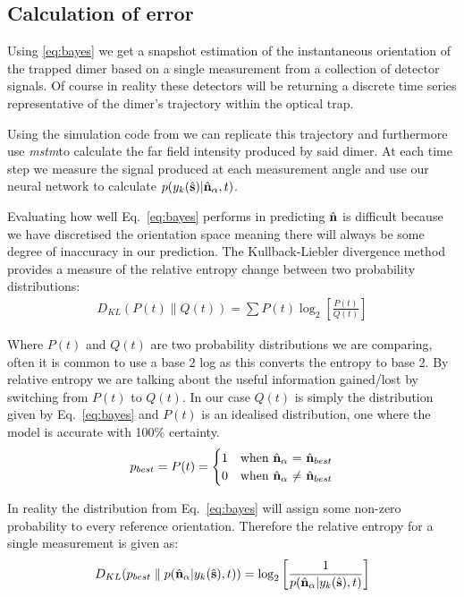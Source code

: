 \subsection{Calculation of error}
\label{sec:divergence}
Using \eqref{eq:bayes} we get a snapshot estimation of the instantaneous
orientation of the trapped dimer based on a single measurement from a 
collection of detector signals. Of course in reality these detectors 
will be returning a discrete time series representative of the dimer's
trajectory within the optical trap. 

Using the simulation code from \cite{Vigilante2020} we can replicate 
this trajectory and furthermore use \textit{mstm}to calculate the far field 
intensity produced by said dimer. At each time step we measure the signal
produced at each measurement angle and use our neural network to calculate
$p(y_k(\hat{\bf s})|\hat{\bf n}_\alpha, t)$. 

Evaluating how well Eq.~\eqref{eq:bayes} performs in predicting $\hat{\bf n}$
is difficult because we have discretised the orientation space meaning 
there will always be some degree of inaccuracy in our prediction. The Kullback-Liebler divergence method provides a measure of the relative
entropy change between two probability distributions:
\begin{align}
	D_{KL}(P(t)\parallel Q(t)) = \sum P(t) \log_2\left[\frac{P(t)}{Q(t)}\right] 
	\label{eq:D_KL}
\end{align} 

Where $P(t)$ and $Q(t)$ are two probability distributions we are
comparing, often it is common to use a base 2 log as this converts 
the entropy to base 2. By relative entropy we are talking about 
the useful information gained/lost by switching from $P(t)$ to 
$Q(t)$. In our case $Q(t)$ is simply the distribution given by
Eq.~\eqref{eq:bayes} and $P(t)$ is an idealised distribution, 
one where the model is accurate with 100\% certainty.
\begin{align}
	\label{eq:best}
	p_{best} = P(t) =
	\begin{cases}
		1 & \text{when $\hat{\bf n}_\alpha$ = $\hat{\bf n}_{best}$}\\
		0 & \text{when $\hat{\bf n}_\alpha$ $\neq$ $\hat{\bf n}_{best}$}
	\end{cases}
\end{align}

In reality the distribution from Eq.~\eqref{eq:bayes} will assign 
some non-zero probability to every reference orientation. Therefore 
the relative entropy for a single measurement is given as:
\begin{align}
	D_{KL}(p_{best}\parallel p(\hat{\bf n}_\alpha| y_k(\hat{\bf s}), t))
	= \log_2 \left[\frac{1}{p(\hat{\bf n}_\alpha| y_k(\hat{\bf s}), t)}
	\right]
	\label{eq:kullback}
\end{align}

